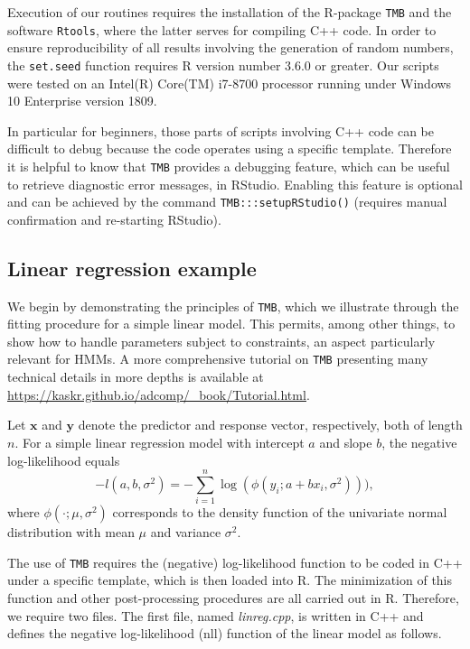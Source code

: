 \documentclass[bimj,fleqn]{w-art}\usepackage[]{graphicx}\usepackage[]{color}
\theoremstyle{plain}
\theoremstyle{definition}
\begin{document}
Execution of our routines requires the installation of the R-package {\tt{TMB}} and the software {\tt{Rtools}}, where the latter serves for compiling C++ code.
In order to ensure reproducibility of all results involving the generation of random numbers, the \texttt{set.seed} function requires R version number 3.6.0 or greater.
Our scripts were tested on an Intel(R) Core(TM) i7-8700 processor running under Windows 10 Enterprise version 1809.

In particular for beginners, those parts of scripts involving C++ code can be difficult to debug because the code operates using a specific template.
Therefore it is helpful to know that {\tt{TMB}} provides a debugging feature, which can be useful to retrieve diagnostic error messages, in RStudio.
Enabling this feature is optional and can be achieved by the command \texttt{TMB:::setupRStudio()} (requires manual confirmation and re-starting RStudio).



\subsection{Linear regression example}
\label{sec:linreg}

We begin by demonstrating the principles of {\tt{TMB}}, which we illustrate through the fitting procedure for a simple linear model.
This permits, among other things, to show how to handle parameters subject to constraints, an aspect particularly relevant for HMMs.
A more comprehensive tutorial on {\tt{TMB}} presenting many technical details in more depths is available at\\
\underline{\url{https://kaskr.github.io/adcomp/\_book/Tutorial.html}}.

Let $\bm{x}$ and $\bm{y}$ denote the predictor and response vector, respectively, both of length $n$.
For a simple linear regression model with intercept $a$ and slope $b$, the negative log-likelihood equals
\begin{equation*}
- l(a, b, \sigma^2) = - \sum_{i=1}^n \log(\phi(y_i; a + bx_i, \sigma^2))),
\end{equation*}
where $\phi(\cdot; \mu, \sigma^2)$ corresponds to the density function of the univariate normal distribution with mean $\mu$ and variance $\sigma^2$.

The use of {\tt{TMB}} requires the (negative) log-likelihood function to be coded in C++ under a specific template, which is then loaded into R.
The minimization of this function and other post-processing procedures are all carried out in R.
Therefore, we require two files.
The first file, named \textit{linreg.cpp}, is written in C++ and defines the negative log-likelihood (nll) function of the linear model as follows.\\
\end{document}

